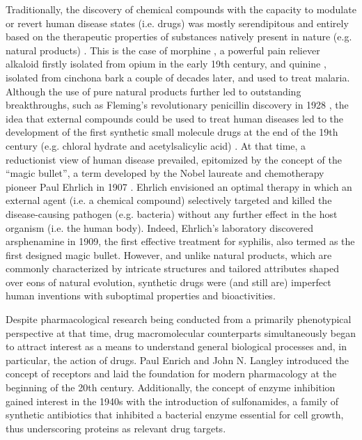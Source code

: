 Traditionally, the discovery of chemical compounds with the capacity to modulate or revert human disease states (i.e. drugs) was mostly serendipitous and entirely based on the therapeutic properties of substances natively present in nature (e.g. natural products) \cite{sneader_drug_2005}. This is the case of morphine \cite{sneader_drug_2005}, a powerful pain reliever alkaloid firstly isolated from opium in the early 19th century, and quinine \cite{achan_quinine_2011}, isolated from cinchona bark a couple of decades later, and used to treat malaria. Although the use of pure natural products further led to outstanding breakthroughs, such as Fleming’s revolutionary penicillin discovery in 1928 \cite{fleming_antibacterial_2001}, the idea that external compounds could be used to treat human diseases led to the development of the first synthetic small molecule drugs at the end of the 19th century (e.g. chloral hydrate and acetylsalicylic acid) \cite{sneader_drug_2005, vane_mechanism_2003}. At that time, a reductionist view of human disease prevailed, epitomized by the concept of the “magic bullet”, a term developed by the Nobel laureate and chemotherapy pioneer Paul Ehrlich in 1907 \cite{strebhardt_paul_2008, schwartz_paul_2004}. Ehrlich envisioned an optimal therapy in which an external agent (i.e. a chemical compound) selectively targeted and killed the disease-causing pathogen (e.g. bacteria) without any further effect in the host organism (i.e. the human body). Indeed, Ehrlich’s laboratory discovered arsphenamine in 1909, the first effective treatment for syphilis, also termed as the first designed magic bullet\cite{bosch_contributions_2008}. However, and unlike natural products, which are commonly characterized by intricate structures and tailored attributes shaped over eons of natural evolution\cite{grigalunas_chemical_2022}, synthetic drugs were (and still are) imperfect human inventions with suboptimal properties and bioactivities.

Despite pharmacological research being conducted from a primarily phenotypical perspective at that time, drug macromolecular counterparts simultaneously began to attract interest as a means to understand general biological processes and, in particular, the action of drugs. Paul Enrich and John N. Langley introduced the concept of receptors and laid the foundation for modern pharmacology at the beginning of the 20th century. Additionally, the concept of enzyme inhibition gained interest in the 1940s with the introduction of sulfonamides, a family of synthetic antibiotics that inhibited a bacterial enzyme essential for cell growth, thus underscoring proteins as relevant drug targets\cite{maehle_emergence_2002}.


